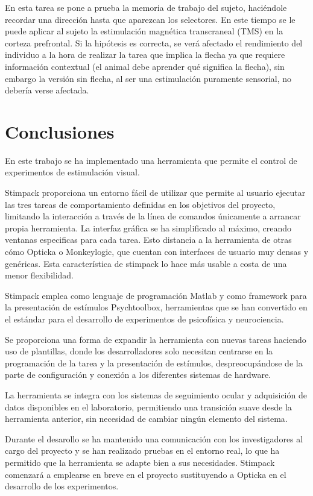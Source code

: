 \documentclass[conference]{IEEEtran}
\begin{document}
En esta tarea se pone a prueba la memoria de trabajo del sujeto, haciéndole recordar una dirección hasta que aparezcan los selectores. 
En este tiempo se le puede aplicar al sujeto la estimulación magnética transcraneal (TMS) en la corteza prefrontal. Si la hipótesis es correcta, se verá afectado el rendimiento del individuo a la hora de realizar la tarea que implica la flecha ya que requiere información contextual (el animal debe aprender qué significa la flecha), sin embargo la versión sin flecha, al ser una estimulación puramente sensorial, no debería verse afectada.

\section{Conclusiones}

En este trabajo se ha implementado una herramienta que permite el control de experimentos de estimulación visual.

Stimpack proporciona un entorno fácil de utilizar que permite al usuario ejecutar las tres tareas de comportamiento definidas en los objetivos del proyecto, limitando la interacción a través de la línea de comandos únicamente a arrancar propia herramienta. La interfaz gráfica se ha simplificado al máximo, creando ventanas especificas para cada tarea. Esto distancia a la herramienta de otras cómo Opticka o Monkeylogic, que cuentan con interfaces de usuario muy densas y genéricas. Esta característica de stimpack lo hace más usable a costa de una menor flexibilidad.

Stimpack emplea como lenguaje de programación Matlab y como framework para la presentación de estímulos Psychtoolbox, herramientas que se han convertido en el estándar para el desarrollo de experimentos de psicofísica y neurociencia.

Se proporciona una forma de expandir la herramienta con nuevas tareas haciendo uso de plantillas, donde los desarrolladores solo necesitan centrarse en la programación de la tarea y la presentación de estímulos, despreocupándose de la parte de configuración y conexión a los diferentes sistemas de hardware.

La herramienta se integra con los sistemas de seguimiento ocular y adquisición de datos disponibles en el laboratorio, permitiendo una transición suave desde la herramienta anterior, sin necesidad de cambiar ningún elemento del sistema.

Durante el desarollo se ha mantenido una comunicación con los investigadores al cargo del proyecto y se han realizado pruebas en el entorno real, lo que ha permitido que la herramienta se adapte bien a sus necesidades. Stimpack comenzará a emplearse en breve en el proyecto sustituyendo a Opticka en el desarrollo de los experimentos.
\end{document}
